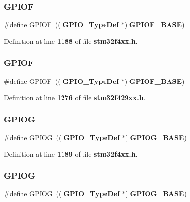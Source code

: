 \subsubsection{G\+P\+I\+OF\hspace{0.1cm}{\footnotesize\ttfamily [1/2]}}
{\footnotesize\ttfamily \#define G\+P\+I\+OF~((\textbf{ G\+P\+I\+O\+\_\+\+Type\+Def} $\ast$) \textbf{ G\+P\+I\+O\+F\+\_\+\+B\+A\+SE})}



Definition at line \textbf{ 1188} of file \textbf{ stm32f4xx.\+h}.

\mbox{\label{group__Peripheral__declaration_ga43c3022dede7c9db7a58d3c3409dbc8d}} 
\subsubsection{G\+P\+I\+OF\hspace{0.1cm}{\footnotesize\ttfamily [2/2]}}
{\footnotesize\ttfamily \#define G\+P\+I\+OF~((\textbf{ G\+P\+I\+O\+\_\+\+Type\+Def} $\ast$) \textbf{ G\+P\+I\+O\+F\+\_\+\+B\+A\+SE})}



Definition at line \textbf{ 1276} of file \textbf{ stm32f429xx.\+h}.

\mbox{\label{group__Peripheral__declaration_ga02a2a23a32f9b02166a8c64012842414}} 
\subsubsection{G\+P\+I\+OG\hspace{0.1cm}{\footnotesize\ttfamily [1/2]}}
{\footnotesize\ttfamily \#define G\+P\+I\+OG~((\textbf{ G\+P\+I\+O\+\_\+\+Type\+Def} $\ast$) \textbf{ G\+P\+I\+O\+G\+\_\+\+B\+A\+SE})}



Definition at line \textbf{ 1189} of file \textbf{ stm32f4xx.\+h}.

\mbox{\label{group__Peripheral__declaration_ga02a2a23a32f9b02166a8c64012842414}} 
\subsubsection{G\+P\+I\+OG\hspace{0.1cm}{\footnotesize\ttfamily [2/2]}}
{\footnotesize\ttfamily \#define G\+P\+I\+OG~((\textbf{ G\+P\+I\+O\+\_\+\+Type\+Def} $\ast$) \textbf{ G\+P\+I\+O\+G\+\_\+\+B\+A\+SE})}



